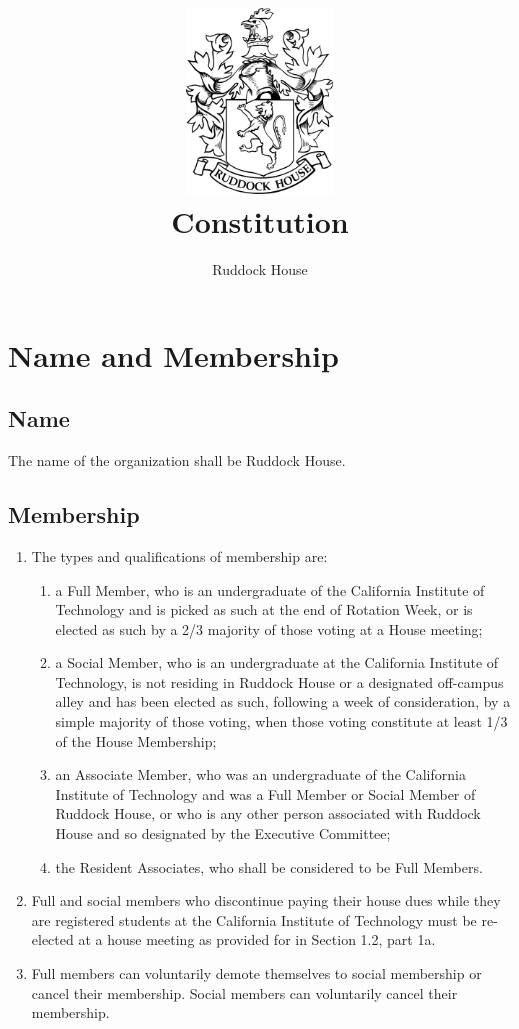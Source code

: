 \documentclass[10pt]{article} %
\title{\includegraphics[width=1.55in]{ruddock_crest.png} \\ Constitution}
\author{Ruddock House}
\begin{document}
\maketitle

\section{Name and Membership}
\subsection{Name}
The name of the organization shall be Ruddock House.
\subsection{Membership}
\begin{enumerate}
\item The types and qualifications of membership are:
\begin{enumerate}
\item a Full Member, who is an undergraduate of the California Institute of Technology and is picked as such at the end of Rotation Week, or is elected as such by a 2/3 majority of those voting at a House meeting;
\item a Social Member, who is an undergraduate at the California Institute of Technology, is not residing in Ruddock House or a designated off-campus alley and has been elected as such, following a week of consideration, by a simple majority of those voting, when those voting constitute at least 1/3 of the House Membership;
\item an Associate Member, who was an undergraduate of the California Institute of Technology and was a Full Member or Social Member of Ruddock House, or who is any other person associated with Ruddock House and so designated by the Executive Committee;
\item the Resident Associates, who shall be considered to be Full Members.
\end{enumerate}
\item Full and social members who discontinue paying their house dues while they are registered students at the California Institute of Technology must be re-elected at a house meeting as provided for in Section 1.2, part 1a.
\item Full members can voluntarily demote themselves to social membership or cancel their membership. Social members can voluntarily cancel their membership.
\end{enumerate}
\end{document}
